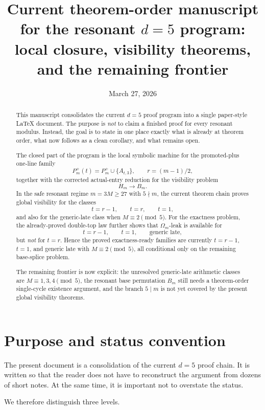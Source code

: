 \documentclass[11pt]{article}
\title{Current theorem-order manuscript for the resonant \(d=5\) program:\\
local closure, visibility theorems, and the remaining frontier}
\author{}
\date{March 27, 2026}
\newcommand{\1}{\mathbf 1}
\newcommand{\Hm}{H_m}
\newcommand{\Bm}{B_m}
\begin{document}
\maketitle

\begin{abstract}
This manuscript consolidates the current \(d=5\) proof program into a single paper-style \LaTeX{} document.
The purpose is \emph{not} to claim a finished proof for every resonant modulus.
Instead, the goal is to state in one place exactly what is already at theorem order, what now follows as a clean corollary, and what remains open.

The closed part of the program is the local symbolic machine for the promoted-plus one-line family
\[
P_m^+(t)=P_m^+\cup\{A_{t,3}\}, \qquad r=(m-1)/2,
\]
together with the corrected actual-entry reduction for the visibility problem
\[
\Hm \to \Bm.
\]
In the safe resonant regime \(m=3M\ge 27\) with \(5\nmid m\), the current theorem chain proves global visibility for the classes
\[
t=r-1,\qquad t=r,\qquad t=1,
\]
and also for the generic-late class when \(M\equiv 2 \pmod 5\).
For the exactness problem, the already-proved double-top law further shows that \(\Omega_m\)-leak is available for
\[
t=r-1,\qquad t=1,\qquad \text{generic late},
\]
but \emph{not} for \(t=r\).
Hence the proved exactness-ready families are currently \(t=r-1\), \(t=1\), and generic late with \(M\equiv 2 \pmod 5\), all conditional only on the remaining base-splice problem.

The remaining frontier is now explicit:
the unresolved generic-late arithmetic classes are \(M\equiv 1,3,4 \pmod 5\), the resonant base permutation \(B_m\) still needs a theorem-order single-cycle existence argument, and the branch \(5\mid m\) is not yet covered by the present global visibility theorems.
\end{abstract}

\tableofcontents

\section{Purpose and status convention}

The present document is a consolidation of the current \(d=5\) proof chain.
It is written so that the reader does not have to reconstruct the argument from dozens of short notes.
At the same time, it is important not to overstate the status.

We therefore distinguish three levels.
\end{document}
